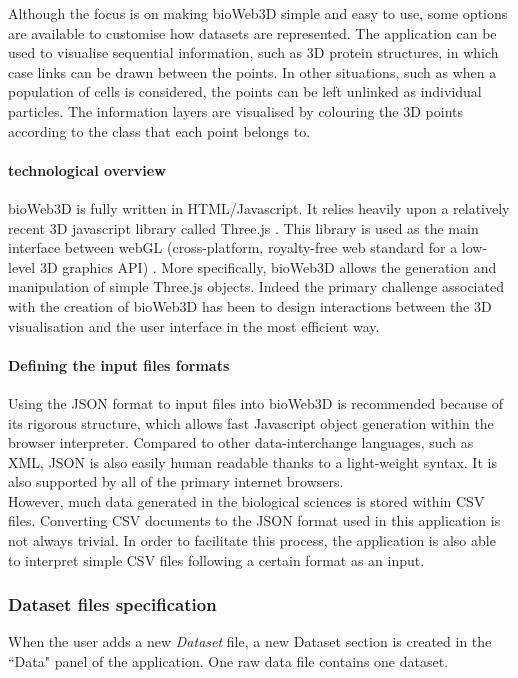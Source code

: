 Although the focus is on making bioWeb3D simple and easy to use, some options are available to customise how datasets are represented. The application can be used to visualise sequential information, such as 3D protein structures, in which case links can be drawn between the points. In other situations, such as when a population of cells is considered, the points can be left unlinked as individual particles. The information layers are visualised by colouring the 3D points according to the class that each point belongs to.

		\paragraph{technological overview}
bioWeb3D is fully written in HTML/Javascript. It relies heavily upon a relatively recent 3D javascript library called Three.js \cite{three}. This library is used as the main interface between webGL (cross-platform, royalty-free web standard for a low-level 3D graphics API) \cite{webgl}. More specifically, bioWeb3D allows the generation and manipulation of simple Three.js objects. Indeed the primary challenge associated with the creation of bioWeb3D has been to design interactions between the 3D visualisation and the user interface in the most efficient way.\\
		\paragraph{Defining the input files formats}
Using the JSON format to input files into bioWeb3D is recommended because of its rigorous structure, which allows fast Javascript object generation within the browser interpreter. Compared to other data-interchange languages, such as XML, JSON is also easily human readable thanks to a light-weight syntax. It is also supported by all of the primary internet browsers.\\
However, much data generated in the biological sciences is stored within CSV files. Converting CSV documents to the JSON format used in this application is not always trivial. In order to facilitate this process, the application is also able to interpret simple CSV files following a certain format as an input.


		\subsubsection{Dataset files specification}
When the user adds a new {\it{Dataset}} file, a new Dataset section is created in the ``Data" panel of the application. One raw data file contains one dataset.\\
